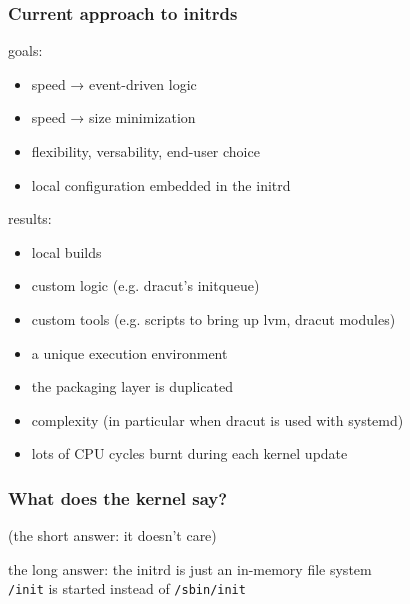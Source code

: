 \documentclass[]{beamer}
\newcommand\pp\pause
\begin{document}
\begin{frame}
  \frametitle{Current approach to initrds}

  \pp
  goals:

  \begin{itemize}
  \item speed → event-driven logic
  \item speed → size minimization
  \item flexibility, versability, end-user choice
  \item local configuration embedded in the initrd
  \end{itemize}

  \pp
  results:

  \begin{itemize}
  \item local builds
  \pp

  \item custom logic (e.g. dracut's initqueue)
  \pp

  \item custom tools (e.g. scripts to bring up lvm, dracut modules)
  \pp

  \item a unique execution environment
  \pp

  \item the packaging layer is duplicated
  \pp

  \item complexity (in particular when dracut is used with systemd)
  \pp

  \item lots of CPU cycles burnt during each kernel update
  \end{itemize}
\end{frame}

\begin{frame}
  \frametitle{What does the kernel say?}

  \pp
  (the short answer: it doesn't care)

  \hfill

  \pp
  the long answer:
  the initrd is just an in-memory file system\\
  \texttt{/init} is started instead of \texttt{/sbin/init}
\end{frame}
\end{document}

